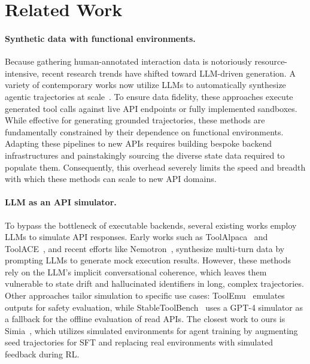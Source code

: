 \section{Related Work}
\paragraph{Synthetic data with functional environments.} 
Because gathering human-annotated interaction data is notoriously resource-intensive, recent research trends have shifted toward LLM-driven generation. A variety of contemporary works now utilize LLMs to automatically synthesize agentic trajectories at scale~\citep{toolllm, agenttuning, apigen, xu2026controllable, lu2026firefly}. To ensure data fidelity, these approaches execute generated tool calls against live API endpoints or fully implemented sandboxes. While effective for generating grounded trajectories, these methods are fundamentally constrained by their dependence on functional environments. Adapting these pipelines to new APIs requires building bespoke backend infrastructures and painstakingly sourcing the diverse state data required to populate them. Consequently, this overhead severely limits the speed and breadth with which these methods can scale to new API domains.

\vspace{-0.05in}
\paragraph{LLM as an API simulator.}
To bypass the bottleneck of executable backends, several existing works employ LLMs to simulate API responses. Early works such as  ToolAlpaca~\citep{toolalpaca} and ToolACE~\citep{toolace}, and recent efforts like Nemotron~\citep{chandiramani2026nemotron}, synthesize multi-turn data by prompting LLMs to generate mock execution results. However, these methods rely on the LLM's implicit conversational coherence, which leaves them vulnerable to state drift and hallucinated identifiers in long, complex trajectories. Other approaches tailor simulation to specific use cases: ToolEmu~\citep{ruan2024identifying} emulates outputs for safety evaluation, while StableToolBench~\citep{stabletoolbench} uses a GPT-4 simulator as a fallback for the offline evaluation of read APIs. The closest work to ours is Simia~\citep{li2025simulating}, which utilizes simulated environments for agent training by augmenting seed trajectories for SFT and replacing real environments with simulated feedback during RL.

